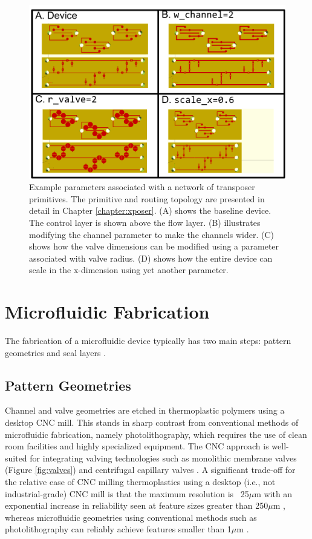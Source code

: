 \begin{figure}[h]
  \begin{minipage}[t]{0.99\linewidth}\centering
    \includegraphics[width=14cm]{params.pdf}
    \medskip
  \end{minipage}\hfill
  \caption[Example device parameters]{Example parameters associated with a network of transposer primitives. The primitive and routing topology are presented in detail in Chapter \ref{chapter:xposer}. (A) shows the baseline device. The control layer is shown above the flow layer. (B) illustrates modifying the channel parameter to make the channels wider. (C) shows how the valve dimensions can be modified using a parameter associated with valve radius. (D) shows how the entire device can scale in the x-dimension using yet another parameter.}
    \label{fig:mfParams}
\end{figure}

\section{Microfluidic Fabrication}
\label{sec:mfFabrication}
The fabrication of a microfluidic device typically has two main steps: pattern geometries and seal layers \cite{mcdonald2002poly}.

\subsection{Pattern Geometries}
Channel and valve geometries are etched in thermoplastic polymers using a desktop CNC mill. This stands in sharp contrast from conventional methods of microfluidic fabrication, namely photolithography, which requires the use of clean room facilities and highly specialized equipment. The CNC approach is well-suited for integrating valving technologies such as monolithic membrane valves \cite{grover2003monolithic} (Figure \ref{fig:valves}) and centrifugal capillary valves \cite{madou1998labcd}. A significant trade-off for the relative ease of CNC milling thermoplastics using a desktop (i.e., not industrial-grade) CNC mill is that the maximum resolution is ~25$\mu$m with an exponential increase in reliability seen at feature sizes greater than 250$\mu$m \cite{guckenberger2015micromilling}, whereas microfluidic geometries using conventional methods such as photolithography can reliably achieve features smaller than 1$\mu$m \cite{mcdonald2002poly}.

